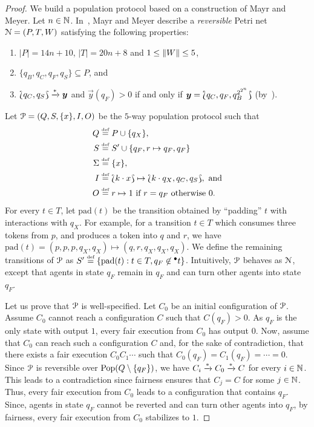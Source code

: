 \begin{proof}
  We build a population protocol based on a construction of Mayr and
  Meyer. Let $n \in \mathbb{N}$. In~\cite[Sect.~6]{MM82}, Mayr and Meyer
  describe a \emph{reversible} Petri net $\mathcal{N} = (P, T, W)$
  satisfying the following properties:
  \begin{enumerate}
    \item $|P| = 14n + 10$, $|T| = 20n + 8$ and $1 \leq \lVert W\rVert \leq 5$,
    \item $\{q_B, q_C, q_F, q_S\} \subseteq P$, and
    \item $\Lbag q_C, q_S\Rbag \xrightarrow{*} \bm{y}$ and $\vec{y}(q_F) >
      0$ if and only if $\bm{y} = \Lbag q_C, q_F, q_B^{2^{2^n}}\Rbag$
      (by~\cite[Lemma~6 and~8]{MM82}).
  \end{enumerate}

  Let $\mathcal{P} = (Q, S, \{x\}, I, O)$ be the $5$-way population protocol
  such that
  \begin{align*}
    Q &\stackrel{\scriptscriptstyle\text{def}}{=} P \cup \{q_X\}, \\
    S &\stackrel{\scriptscriptstyle\text{def}}{=} S' \cup \{q_F, r \mapsto q_F, q_F\} \\
    \Sigma &\stackrel{\scriptscriptstyle\text{def}}{=} \{x\}, \\
    I &\stackrel{\scriptscriptstyle\text{def}}{=} \Lbag k \cdot x\Rbag \mapsto \Lbag k \cdot q_X,
      q_C, q_S\Rbag, \text{ and} \\
    O &\stackrel{\scriptscriptstyle\text{def}}{=} r \mapsto 1 \text{ if } r = q_F \text{ otherwise } 0.
  \end{align*}
  For every $t \in T$, let $\mathrm{pad}(t)$ be the transition
  obtained by ``padding'' $t$ with interactions with $q_X$. For
  example, for a transition $t \in T$ which consumes three tokens from
  $p$, and produces a token into $q$ and $r$, we have $\mathrm{pad}(t)
  = (p, p, p, q_X, q_X) \mapsto (q, r, q_X, q_X, q_X)$. We define the
  remaining transitions of $\mathcal{P}$ as $S' \stackrel{\scriptscriptstyle\text{def}}{=} \{\mathrm{pad}(t) : t
  \in T, q_F \not\in {^\bullet t}\}$. Intuitively, $\mathcal{P}$ behaves as $\mathcal{N}$,
  except that agents in state $q_F$ remain in $q_F$ and can turn other
  agents into state $q_F$.

  Let us prove that $\mathcal{P}$ is well-specified. Let $C_0$ be an initial
  configuration of $\mathcal{P}$. Assume $C_0$ cannot reach a configuration
  $C$ such that $C(q_F) > 0$. As $q_F$ is the only state with output
  $1$, every fair execution from $C_0$ has output $0$. Now, assume
  that $C_0$ can reach such a configuration $C$ and, for the sake of
  contradiction, that there exists a fair execution $C_0 C_1 \cdots$
  such that $C_0(q_F) = C_1(q_F) = \cdots = 0$. Since $\mathcal{P}$ is
  reversible over $\mathrm{Pop}(Q \setminus \{q_F\})$, we have $C_i \xrightarrow{*}
  C_0 \xrightarrow{*} C$ for every $i \in \mathbb{N}$. This leads to a contradiction
  since fairness ensures that $C_j = C$ for some $j \in \mathbb{N}$. Thus,
  every fair execution from $C_0$ leads to a configuration that
  contains $q_F$. Since, agents in state $q_F$ cannot be reverted and
  can turn other agents into $q_F$, by fairness, every fair execution
  from $C_0$ stabilizes to $1$.


\end{proof}
